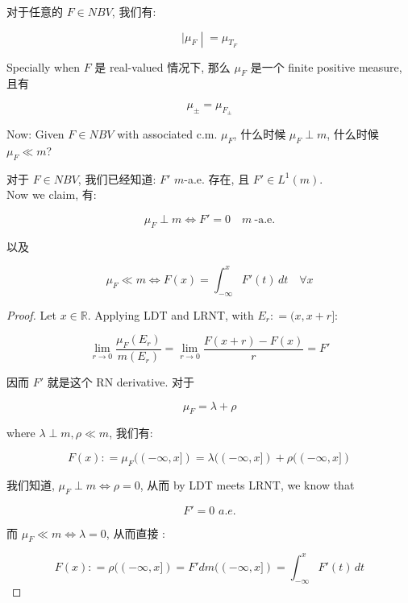 \begin{theorem}{}

对于任意的 \(F \in NBV\), 我们有:

\[\left. |\mu_{F} \middle| = \mu_{T_{F}} \right.\]

Specially when \(F\) 是 real-valued 情况下, 那么 \(\mu_{F}\) 是一个 finite positive measure, 且有

\[\mu_{\pm} = \mu_{F_{\pm}}\]

\end{theorem}

Now: Given \(F \in NBV\) with associated c.m. \(\mu_{F}\), 什么时候 \(\mu_{F} \perp m\), 什么时候 \(\mu_{F} \ll m\)?

\begin{theorem}{}

对于 \(F \in NBV\), 我们已经知道: \(F'\) \(m\)-a.e. 存在, 且 \(F' \in L^{1}(m)\).\\
Now we claim, 有:

\[\mu_{F} \perp m\Leftrightarrow F' = 0\quad m\ \text{-a.e.}\]

以及

\[\mu_{F} \ll m\Leftrightarrow F(x) = \int_{- \infty}^{x}F'(t)\, dt\quad\forall x\]

\end{theorem}

\begin{proof}

Let \(x \in \mathbb{R}\). Applying LDT and LRNT, with \(E_{r}: = (x,x + r\rbrack\):

\[\lim\limits_{r\rightarrow 0}\frac{\mu_{F}(E_{r})}{m(E_{r})} = \lim\limits_{r\rightarrow 0}\frac{F(x + r) - F(x)}{r} = F'\]

因而 \(F'\) 就是这个 RN derivative. 对于

\[\mu_{F} = \lambda + \rho\]

where \(\lambda \perp m,\rho \ll m\), 我们有:

\[F(x): = \mu_{F}(( - \infty,x\rbrack) = \lambda(( - \infty,x\rbrack) + \rho(( - \infty,x\rbrack)\]

我们知道, \(\mu_{F} \perp m\Leftrightarrow\rho = 0\), 从而 by LDT meets LRNT, we know that

\[F' = 0\,\, a.e.\]

而 \(\mu_{F} \ll m\Leftrightarrow\lambda = 0\), 从而直接 :

\[F(x): = \rho(( - \infty,x\rbrack) = F'dm(( - \infty,x\rbrack) = \int_{- \infty}^{x}F'(t)\, dt\]

\end{proof}

